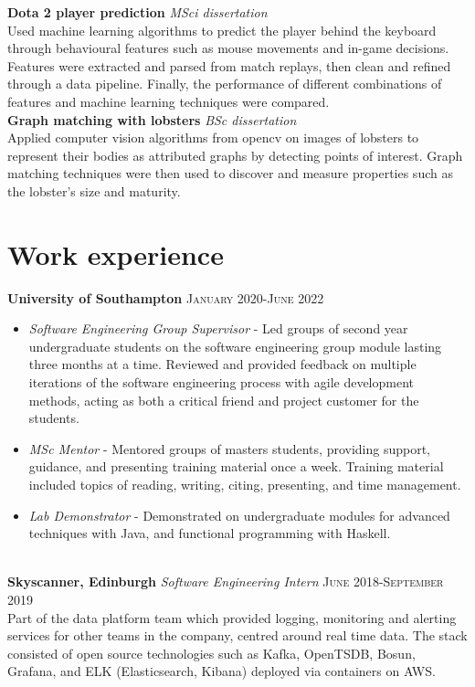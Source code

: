 \documentclass{article}
\begin{document}

\textbf{Dota 2 player prediction} \textit{MSci dissertation} \\
Used machine learning algorithms to predict the player behind the keyboard through 
behavioural features such as mouse movements and in-game decisions. Features were 
extracted and parsed from match replays, then clean and refined through a data pipeline.
Finally, the performance of different combinations of features and machine learning 
techniques were compared.
\\

\textbf{Graph matching with lobsters} \textit{BSc dissertation} \\
Applied computer vision algorithms from opencv on images of lobsters to represent their bodies as
attributed graphs by detecting points of interest. Graph matching techniques were then
used to discover and measure properties such as the lobster's size and maturity.

\section*{Work experience}
\textbf{University of Southampton} \hfill \textsc{January 2020-June 2022}
\begin{itemize}
    \item \textit{Software Engineering Group Supervisor} - Led groups of
    second year undergraduate students on the software engineering group module lasting
    three months at a time. Reviewed and provided feedback on multiple iterations
    of the software engineering process with agile development methods, acting as
    both a critical friend and project customer for the students.
    \item \textit{MSc Mentor} - Mentored groups of masters students,
    providing support, guidance, and presenting training material once a week. Training material
    included topics of reading, writing, citing, presenting, and time management.
    \item \textit{Lab Demonstrator} - Demonstrated on undergraduate modules
    for advanced techniques with Java, and functional programming with Haskell.
\end{itemize}
\ \\
\textbf{Skyscanner, Edinburgh} \textit{Software Engineering Intern}
\hfill
\textsc{June 2018-September 2019} \\
Part of the data platform team which provided logging, monitoring and alerting services for
other teams in the company, centred around real time data. The stack consisted of open source
technologies such as Kafka, OpenTSDB, Bosun, Grafana, and ELK (Elasticsearch, Kibana)
deployed via containers on AWS.
\newline
\end{document}

